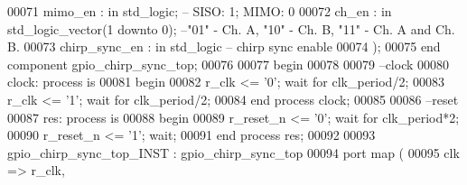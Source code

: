 \begin{DoxyCode}
00071         mimo_en              : \textcolor{keywordflow}{in} \textcolor{comment}{std\_logic}; \textcolor{keyword}{-- SISO: 1; MIMO: 0}
00072         ch_en                : \textcolor{keywordflow}{in} \textcolor{comment}{std\_logic\_vector}(\textcolor{vhdllogic}{}\textcolor{vhdllogic}{1} \textcolor{keywordflow}{downto} \textcolor{vhdllogic}{}\textcolor{vhdllogic}{0}); \textcolor{keyword}{--"01" - Ch. A, "10" - Ch. B, "11" - Ch. A
       and Ch. B. }
00073         chirp_sync_en           : \textcolor{keywordflow}{in} \textcolor{comment}{std\_logic}\textcolor{keyword}{  -- chirp sync enable}
00074     );
00075     \textcolor{keywordflow}{end} \textcolor{keywordflow}{component} \textcolor{vhdlchar}{gpio_chirp_sync_top};
00076     
00077 \textcolor{vhdlkeyword}{begin}
00078 
00079 \textcolor{keyword}{--clock}
00080 clock: \textcolor{keywordflow}{process} \textcolor{keywordflow}{is}
00081 \textcolor{vhdlkeyword}{begin}
00082     \textcolor{vhdlchar}{r_clk} \textcolor{vhdlchar}{<=} \textcolor{vhdlchar}{'}\textcolor{vhdllogic}{}\textcolor{vhdllogic}{0}\textcolor{vhdlchar}{'}; \textcolor{keywordflow}{wait} \textcolor{keywordflow}{for} \textcolor{vhdlchar}{clk_period}\textcolor{vhdlchar}{/}\textcolor{vhdllogic}{}\textcolor{vhdllogic}{2};
00083     \textcolor{vhdlchar}{r_clk} \textcolor{vhdlchar}{<=} \textcolor{vhdlchar}{'}\textcolor{vhdllogic}{}\textcolor{vhdllogic}{1}\textcolor{vhdlchar}{'}; \textcolor{keywordflow}{wait} \textcolor{keywordflow}{for} \textcolor{vhdlchar}{clk_period}\textcolor{vhdlchar}{/}\textcolor{vhdllogic}{}\textcolor{vhdllogic}{2};
00084 \textcolor{keywordflow}{end} \textcolor{keywordflow}{process} \textcolor{vhdlchar}{clock};
00085 
00086 \textcolor{keyword}{--reset}
00087 res: \textcolor{keywordflow}{process} \textcolor{keywordflow}{is}
00088 \textcolor{vhdlkeyword}{begin}
00089     \textcolor{vhdlchar}{r_reset_n} \textcolor{vhdlchar}{<=} \textcolor{vhdlchar}{'}\textcolor{vhdllogic}{}\textcolor{vhdllogic}{0}\textcolor{vhdlchar}{'}; \textcolor{keywordflow}{wait} \textcolor{keywordflow}{for} \textcolor{vhdlchar}{clk_period}\textcolor{vhdlchar}{*}\textcolor{vhdllogic}{}\textcolor{vhdllogic}{2};
00090     \textcolor{vhdlchar}{r_reset_n} \textcolor{vhdlchar}{<=} \textcolor{vhdlchar}{'}\textcolor{vhdllogic}{}\textcolor{vhdllogic}{1}\textcolor{vhdlchar}{'}; \textcolor{keywordflow}{wait};
00091 \textcolor{keywordflow}{end} \textcolor{keywordflow}{process} \textcolor{vhdlchar}{res};
00092 
00093 gpio\_chirp\_sync\_top\_INST : gpio_chirp_sync_top
00094     \textcolor{keywordflow}{port} \textcolor{keywordflow}{map} (
00095         clk                 => r_clk,

\end{DoxyCode}
